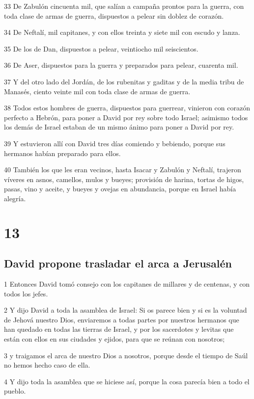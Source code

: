 \par 33 De Zabulón cincuenta mil, que salían a campaña prontos para la guerra, con toda clase de armas de guerra, dispuestos a pelear sin doblez de corazón.
\par 34 De Neftalí, mil capitanes, y con ellos treinta y siete mil con escudo y lanza.
\par 35 De los de Dan, dispuestos a pelear, veintiocho mil seiscientos.
\par 36 De Aser, dispuestos para la guerra y preparados para pelear, cuarenta mil.
\par 37 Y del otro lado del Jordán, de los rubenitas y gaditas y de la media tribu de Manasés, ciento veinte mil con toda clase de armas de guerra.
\par 38 Todos estos hombres de guerra, dispuestos para guerrear, vinieron con corazón perfecto a Hebrón, para poner a David por rey sobre todo Israel; asimismo todos los demás de Israel estaban de un mismo ánimo para poner a David por rey.
\par 39 Y estuvieron allí con David tres días comiendo y bebiendo, porque sus hermanos habían preparado para ellos.
\par 40 También los que les eran vecinos, hasta Isacar y Zabulón y Neftalí, trajeron víveres en asnos, camellos, mulos y bueyes; provisión de harina, tortas de higos, pasas, vino y aceite, y bueyes y ovejas en abundancia, porque en Israel había alegría.


\chapter{13}

\section*{David propone trasladar el arca a Jerusalén}

\par 1 Entonces David tomó consejo con los capitanes de millares y de centenas, y con todos los jefes.
\par 2 Y dijo David a toda la asamblea de Israel: Si os parece bien y si es la voluntad de Jehová nuestro Dios, enviaremos a todas partes por nuestros hermanos que han quedado en todas las tierras de Israel, y por los sacerdotes y levitas que están con ellos en sus ciudades y ejidos, para que se reúnan con nosotros;
\par 3 y traigamos el arca de nuestro Dios a nosotros, porque desde el tiempo de Saúl no hemos hecho caso de ella.
\par 4 Y dijo toda la asamblea que se hiciese así, porque la cosa parecía bien a todo el pueblo.

